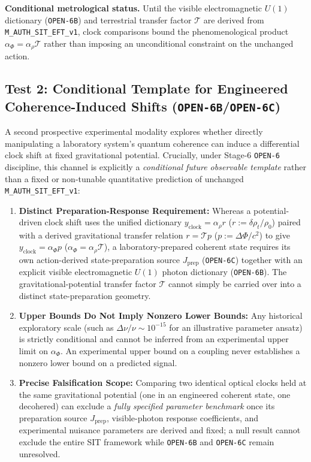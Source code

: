 \textbf{Conditional metrological status.} Until the visible electromagnetic \(U(1)\) dictionary (\texttt{OPEN-6B}) and terrestrial transfer factor \(\mathcal{T}\) are derived from \texttt{M\_AUTH\_SIT\_EFT\_v1}, clock comparisons bound the phenomenological product \(\alpha_\Phi = \alpha_\rho\mathcal{T}\) rather than imposing an unconditional constraint on the unchanged action.

\subsection{Test 2: Conditional Template for Engineered Coherence-Induced Shifts (\texttt{OPEN-6B}/\texttt{OPEN-6C})}
A second prospective experimental modality explores whether directly manipulating a laboratory system's quantum coherence can induce a differential clock shift at fixed gravitational potential. Crucially, under Stage-6 \texttt{OPEN-6} discipline, this channel is explicitly a \emph{conditional future observable template} rather than a fixed or non-tunable quantitative prediction of unchanged \texttt{M\_AUTH\_SIT\_EFT\_v1}:
\begin{enumerate}[leftmargin=2em]
  \item \textbf{Distinct Preparation-Response Requirement:} Whereas a potential-driven clock shift uses the unified dictionary $y_{\mathrm{clock}} = \alpha_\rho r$ ($r := \delta\rho_t/\rho_0$) paired with a derived gravitational transfer relation $r = \mathcal{T} p$ ($p := \Delta\Phi/c^2$) to give $y_{\mathrm{clock}} = \alpha_\Phi p$ ($\alpha_\Phi = \alpha_\rho\mathcal{T}$), a laboratory-prepared coherent state requires its own action-derived state-preparation source $J_{\mathrm{prep}}$ (\texttt{OPEN-6C}) together with an explicit visible electromagnetic $U(1)$ photon dictionary (\texttt{OPEN-6B}). The gravitational-potential transfer factor $\mathcal{T}$ cannot simply be carried over into a distinct state-preparation geometry.
  \item \textbf{Upper Bounds Do Not Imply Nonzero Lower Bounds:} Any historical exploratory scale (such as $\Delta\nu/\nu \sim 10^{-15}$ for an illustrative parameter ansatz) is strictly conditional and cannot be inferred from an experimental upper limit on $\alpha_\Phi$. An experimental upper bound on a coupling never establishes a nonzero lower bound on a predicted signal.
  \item \textbf{Precise Falsification Scope:} Comparing two identical optical clocks held at the same gravitational potential (one in an engineered coherent state, one decohered) can exclude a \emph{fully specified parameter benchmark} once its preparation source $J_{\mathrm{prep}}$, visible-photon response coefficients, and experimental nuisance parameters are derived and fixed; a null result cannot exclude the entire SIT framework while \texttt{OPEN-6B} and \texttt{OPEN-6C} remain unresolved.
\end{enumerate}

